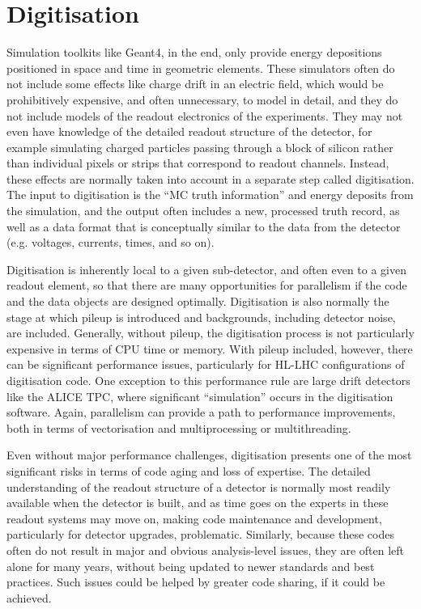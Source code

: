 \documentclass[12pt,a4paper]{article}
\begin{document}
\hypertarget{digitisation}{%
\section{Digitisation}\label{digitisation}}

Simulation toolkits like Geant4, in the end, only provide energy
depositions positioned in space and time in geometric elements. These
simulators often do not include some effects like charge drift in an
electric field, which would be prohibitively expensive, and often
unnecessary, to model in detail, and they do not include models of the
readout electronics of the experiments. They may not even have knowledge
of the detailed readout structure of the detector, for example
simulating charged particles passing through a block of silicon rather
than individual pixels or strips that correspond to readout channels.
Instead, these effects are normally taken into account in a separate
step called digitisation. The input to digitisation is the ``MC truth
information'' and energy deposits from the simulation, and the output
often includes a new, processed truth record, as well as a data format
that is conceptually similar to the data from the detector (e.g.
voltages, currents, times, and so on).

Digitisation is inherently local to a given sub-detector, and often even
to a given readout element, so that there are many opportunities for
parallelism if the code and the data objects are designed optimally.
Digitisation is also normally the stage at which pileup is introduced
and backgrounds, including detector noise, are included. Generally,
without pileup, the digitisation process is not particularly expensive
in terms of CPU time or memory. With pileup included, however, there can
be significant performance issues, particularly for HL-LHC
configurations of digitisation code. One exception to this performance
rule are large drift detectors like the ALICE TPC, where significant
``simulation'' occurs in the digitisation software. Again, parallelism
can provide a path to performance improvements, both in terms of
vectorisation and multiprocessing or multithreading.

Even without major performance challenges, digitisation presents one of
the most significant risks in terms of code aging and loss of expertise.
The detailed understanding of the readout structure of a detector is
normally most readily available when the detector is built, and as time
goes on the experts in these readout systems may move on, making code
maintenance and development, particularly for detector upgrades,
problematic. Similarly, because these codes often do not result in major
and obvious analysis-level issues, they are often left alone for many
years, without being updated to newer standards and best practices. Such
issues could be helped by greater code sharing, if it could be achieved.
\end{document}
